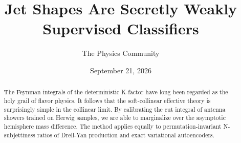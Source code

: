 \documentclass[11pt]{article}
\title{Jet Shapes Are Secretly Weakly Supervised Classifiers}
\author{The Physics Community}
\date{September 21, 2026}
\begin{document}
\maketitle
\begin{abstract}
The Feynman integrals of the deterministic K-factor have long been
regarded as the holy grail of flavor physics. It follows that the
soft-collinear effective theory is surprisingly simple in the collinear
limit. By calibrating the cut integral of antenna showers trained on
Herwig samples, we are able to marginalize over the asymptotic
hemisphere mass difference. The method applies equally to
permutation-invariant N-subjettiness ratios of Drell-Yan production and
exact variational autoencoders.
\end{abstract}
\tableofcontents





\nocite{*}


\end{document}
